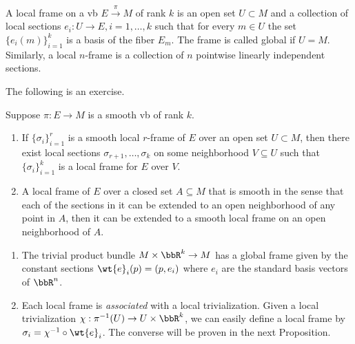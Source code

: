     
\begin{defn}[Frames]
    A local frame on a \gls{vb}  $E\overset{\pi}{\to}M$ of rank $k$ is an open set $U\subset M$ and a collection of local sections $e_i:U\to E,i=1,\ldots,k$ such that for every $m\in U$ the set $\{e_i(m)\}_{i=1}^k$ is a basis of the fiber $E_m$. The frame is called global if $U=M$. Similarly, a local $n$-frame is a collection of $n$ pointwise linearly independent sections.
\end{defn}


The following is an exercise.
\begin{prop}\label{prop 10.15 Lee}
    Suppose $\pi:E\to M$ is a smooth \gls{vb} of rank $k$.
    \begin{enumerate}[label=(\alph*)]
        \item If $\{\sigma_i\}_{i=1}^r$ is a smooth local $r$-frame of $E$ over an open set $U\subset M$, then there exist local sections $\sigma_{r+1},\ldots,\sigma_k$ on some neighborhood $V\subseteq U$ such that $\{\sigma_i\}_{i=1}^k$ is a local frame for $E$ over $V$.
        \item A local frame of $E$ over a closed set $A\subseteq M$ that is smooth in the sense that each of the sections in it can be extended to an open neighborhood of any point in $A$, then it can be extended to a smooth local frame on an open neighborhood of $A$.
    \end{enumerate}
\end{prop}

\begin{example}
    \begin{enumerate}
        \item The trivial product bundle $M\times\bbR^k\to M$ has a global frame given by the constant sections $\wt{e}_i(p)=(p,e_i)$ where $e_i$ are the standard basis vectors of $\bbR^n$.
        \item Each local frame is \emph{associated} with a local trivialization. Given a local trivialization $\chi:\pi^{-1}(U)\to U\times\bbR^k$, we can easily define a local frame by $\sigma_i=\chi^{-1}\circ\wt{e}_i$. The converse will be proven in the next Proposition.
    \end{enumerate}
\end{example}

